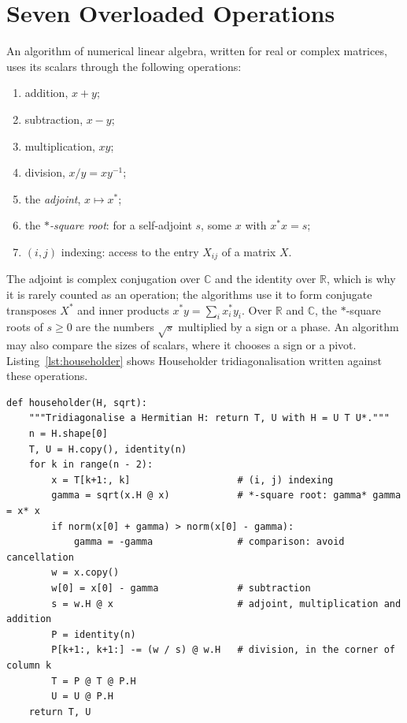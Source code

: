 \documentclass[12pt, a4paper]{report}
\theoremstyle{plain}
\theoremstyle{definition}
\theoremstyle{remark}
\theoremstyle{plain}
\newcommand{\RR}{\mathbb{R}}
\newcommand{\CC}{\mathbb{C}}
\begin{document}
\section{Seven Overloaded Operations}
\label{sec:proposal}
An algorithm of numerical linear algebra, written for real or complex matrices, uses its scalars through the following operations:
\begin{enumerate}[label=(O\arabic*),nosep]
  \item addition, $x+y$;
  \item subtraction, $x-y$;
  \item multiplication, $xy$;
  \item division, $x/y=xy^{-1}$;
  \item the \emph{adjoint}, $x\mapsto x^*$;
  \item the \emph{$*$-square root}: for a self-adjoint $s$, some $x$ with $x^*x=s$;
  \item $(i,j)$ indexing: access to the entry $X_{ij}$ of a matrix $X$.
\end{enumerate}
The adjoint is complex conjugation over $\CC$ and the identity over $\RR$, which is why it is rarely counted as an operation; the algorithms use it to form conjugate transposes $X^*$ and inner products $x^*y=\sum_ix_i^*y_i$. Over $\RR$ and $\CC$, the $*$-square roots of $s\geq0$ are the numbers $\sqrt s$ multiplied by a sign or a phase. An algorithm may also compare the sizes of scalars, where it chooses a sign or a pivot. Listing~\ref{lst:householder} shows Householder tridiagonalisation written against these operations.

\begin{lstlisting}[float=tbp,label={lst:householder},caption={Householder tridiagonalisation written against the seven operations, in Python with NumPy-style slicing; \texttt{X.H} is the conjugate transpose, formed with the adjoint. It simplifies the function \texttt{householder} of Appendix~\ref{chap:code}, which also reports breakdowns and skips columns that are already reduced.}]
def householder(H, sqrt):
    """Tridiagonalise a Hermitian H: return T, U with H = U T U*."""
    n = H.shape[0]
    T, U = H.copy(), identity(n)
    for k in range(n - 2):
        x = T[k+1:, k]                   # (i, j) indexing
        gamma = sqrt(x.H @ x)            # *-square root: gamma* gamma = x* x
        if norm(x[0] + gamma) > norm(x[0] - gamma):
            gamma = -gamma               # comparison: avoid cancellation
        w = x.copy()
        w[0] = x[0] - gamma              # subtraction
        s = w.H @ x                      # adjoint, multiplication and addition
        P = identity(n)
        P[k+1:, k+1:] -= (w / s) @ w.H   # division, in the corner of column k
        T = P @ T @ P.H
        U = U @ P.H
    return T, U
\end{lstlisting}
\end{document}
